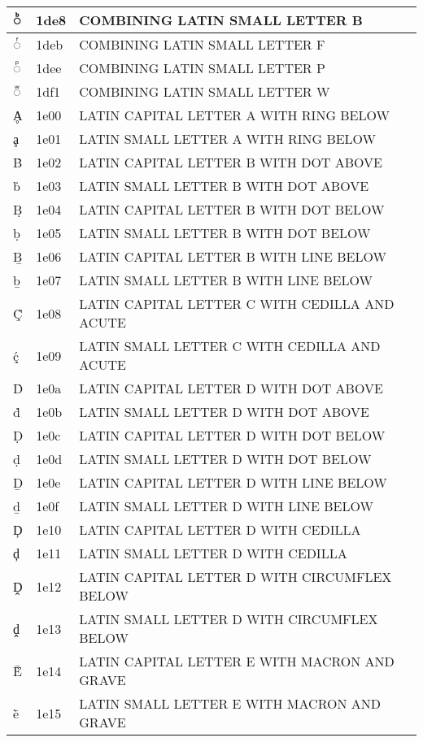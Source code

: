 \documentclass[12pt,letterpaper,openany]{book}
\begin{document}
\begin{center}
\begin{supertabular}{|m{0.25in}|m{0.5in}|m{4in}|}
			◌ᷨ & 1de8 & COMBINING LATIN SMALL LETTER B\\\hline
			◌ᷫ & 1deb & COMBINING LATIN SMALL LETTER F\\\hline
			◌ᷮ & 1dee & COMBINING LATIN SMALL LETTER P\\\hline
			◌ᷱ & 1df1 & COMBINING LATIN SMALL LETTER W\\\hline
			Ḁ & 1e00 & LATIN CAPITAL LETTER A WITH RING BELOW\\\hline
			ḁ & 1e01 & LATIN SMALL LETTER A WITH RING BELOW\\\hline
			Ḃ & 1e02 & LATIN CAPITAL LETTER B WITH DOT ABOVE\\\hline
			ḃ & 1e03 & LATIN SMALL LETTER B WITH DOT ABOVE\\\hline
			Ḅ & 1e04 & LATIN CAPITAL LETTER B WITH DOT BELOW\\\hline
			ḅ & 1e05 & LATIN SMALL LETTER B WITH DOT BELOW\\\hline
			Ḇ & 1e06 & LATIN CAPITAL LETTER B WITH LINE BELOW\\\hline
			ḇ & 1e07 & LATIN SMALL LETTER B WITH LINE BELOW\\\hline
			Ḉ & 1e08 & LATIN CAPITAL LETTER C WITH CEDILLA AND ACUTE\\\hline
			ḉ & 1e09 & LATIN SMALL LETTER C WITH CEDILLA AND ACUTE\\\hline
			Ḋ & 1e0a & LATIN CAPITAL LETTER D WITH DOT ABOVE\\\hline
			ḋ & 1e0b & LATIN SMALL LETTER D WITH DOT ABOVE\\\hline
			Ḍ & 1e0c & LATIN CAPITAL LETTER D WITH DOT BELOW\\\hline
			ḍ & 1e0d & LATIN SMALL LETTER D WITH DOT BELOW\\\hline
			Ḏ & 1e0e & LATIN CAPITAL LETTER D WITH LINE BELOW\\\hline
			ḏ & 1e0f & LATIN SMALL LETTER D WITH LINE BELOW\\\hline
			Ḑ & 1e10 & LATIN CAPITAL LETTER D WITH CEDILLA\\\hline
			ḑ & 1e11 & LATIN SMALL LETTER D WITH CEDILLA\\\hline
			Ḓ & 1e12 & LATIN CAPITAL LETTER D WITH CIRCUMFLEX BELOW\\\hline
			ḓ & 1e13 & LATIN SMALL LETTER D WITH CIRCUMFLEX BELOW\\\hline
			Ḕ & 1e14 & LATIN CAPITAL LETTER E WITH MACRON AND GRAVE\\\hline
			ḕ & 1e15 & LATIN SMALL LETTER E WITH MACRON AND GRAVE\\\hline

\end{supertabular}
\end{center}
\end{document}
